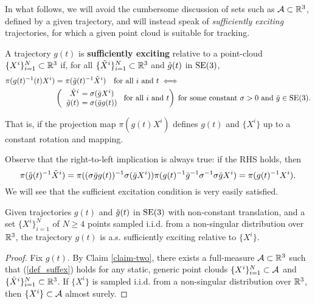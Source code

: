 In what follows, we will avoid the cumbersome discussion of sets such as $\mathcal{A}\subset\mathbb{R}^3$,
defined by a given trajectory,
and will instead speak of \emph{sufficiently exciting} trajectories, 
for which a given point cloud is suitable for tracking.
\begin{defn}
A trajectory $g(t)$ is {\textbf{sufficiently exciting}} relative to a point-\break cloud $\{X^i\}_{i=1}^N\subset\mathbb{R}^3$ if,
for all $\{\tilde{X}^i\}_{i=1}^N\subset\mathbb{R}^3$ and $\tilde{g}(t)$ in $\operatorname{SE}(3)$,
\begin{align}
\pi(g(t)\inv(t)X^i) &= \pi(\gw(t)\inv \Xw^i) 
\quad\text{for all $i$ and $t$}\label{def_suffex}
\iff
\\
&
\left(
\begin{tabular}{>{$}r<{$}>{$\!\!\!\!\!}l<{$}}
\Xw^i &= \sigma(\bar g X^i)\\
\gw(t) &= \sigma(\bar g g(t))
\end{tabular}
\;\text{for all $i$ and $t$}
\right)
\;\text{for some constant $\sigma>0$ and $\bar g\in\SE(3)$.}\notag
\end{align}

That is, if the projection map $\pi(g(t)X^i)$ defines $g(t)$ and $\{X^i\}$ up to a constant rotation and mapping.
\end{defn}
\noindent
Observe that the right-to-left implication is always true:  if the RHS holds, then
$$\pi(\tilde{g}(t)^{-1}\tilde{X}^i) = \pi((\sigma \bar g g(t))^{-1} \sigma(\bar g X^i)) 
\pi(g(t)^{-1} \bar g^{-1} \sigma^{-1} \sigma \bar g X^i )
= \pi(g(t)^{-1} X^i).$$
We will see that the sufficient excitation condition is very easily satisfied.
\begin{claim}
Given trajectories $g(t)$ and $\tilde{g}(t)$ in $\operatorname{SE}(3)$ with non-constant translation, 
and a set $\{X^i\}_{i=1}^N$ of $N\geq 4$ points sampled i.i.d. from a non-singular distribution over $\mathbb{R}^3$,
the trajectory $g(t)$ is a.s. sufficiently exciting relative to $\{X^i\}$.
\end{claim}
\begin{proof}
Fix $g(t)$. By Claim \ref{claim-two},
there exists a full-measure $\mathcal{A}\subset\mathbb{R}^3$ such that (\ref{def_suffex}) holds for any 
static, generic point clouds
$\{X^i\}_{i=1}^N\subset\mathcal{A}$ and 
$\{\tilde{X}^i\}_{i=1}^N\subset\mathbb{R}^3$.
If $\{X^i\}$ is sampled i.i.d. from a non-singular distribution over $\mathbb{R}^3$, 
then $\{X^i\}\subset\mathcal{A}$ almost surely.
\end{proof}

